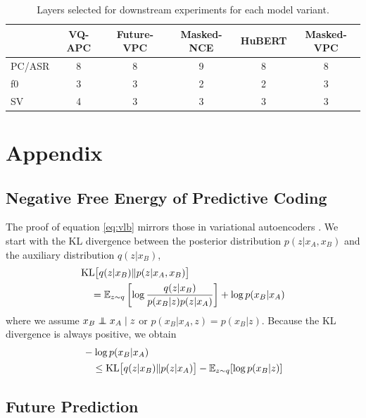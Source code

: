 \begin{table}[ht]
\centering
\small
\begin{tabular}{lccccc}
\toprule
 & VQ-APC & Future-VPC & Masked-NCE & HuBERT & Masked-VPC\\
\midrule
PC/ASR & 8      & 8          & 9           & 8      & 8       \\
f0 & 3      & 3          & 2           & 2      & 3       \\
SV & 4      & 3          & 3           & 3      & 3       \\
\bottomrule
\end{tabular}
\caption{Layers selected for downstream experiments for each model variant.}
\label{tab:layers}
\end{table}

\section{Appendix}

\subsection{Negative Free Energy of Predictive Coding}
\label{appendix:proof}

The proof of equation \ref{eq:vlb} mirrors those in variational autoencoders \citep{Kingma2014}.
We start with the KL divergence between the posterior distribution $p(z|x_A, x_B)$
and the auxiliary distribution $q(z|x_B)$,
\begin{align}
&\mathrm{KL}\big[q(z|x_B)\|p(z|x_A,x_B)\big] \\
&\quad = \mathbb{E}_{z \sim q} \left[\log \frac{q(z | x_B)}{p(x_B | z) p(z | x_A)} \right] + \log p(x_B|x_A) \notag
\label{eq:proof}
\end{align}
where we assume $x_B \perp\!\!\!\!\perp x_A \mid z$ or $p(x_B|x_A, z) = p(x_B|z)$.
Because the KL divergence is always positive, we obtain
\begin{align}
&-\log p(x_B | x_A) \\
&\quad \leq \mathrm{KL} \big[q(z|x_B)\|p(z|x_A)\big] - \mathbb{E}_{z \sim q}[\log p(x_B | z)] \notag
\end{align}

\subsection{Future Prediction}

